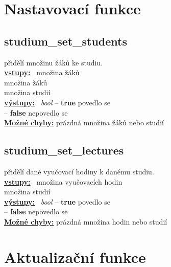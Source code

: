 \documentclass[a4paper, 11pt, twocolumn]{article}
\begin{document}
\section{Nastavovací funkce}\label{nastavovacuxed-funkce}

\subsection{studium\_set\_students}\label{studiumux5fsetux5fstudents}
\vspace*{-0.3cm}
přidělí množinu žáků ke studiu. \\
\noindent \underline{\textbf{vstupy:}} \, množina žáků  \\
\noindent \hspace*{1.4cm} množina žáků \\
\noindent \hspace*{1.4cm} množina studií  \\
\noindent \underline{\textbf{výstupy:}} \, \textit{bool} -- \textbf{true} povedlo se \\
\hspace*{2.35cm} -- \textbf{false} nepovedlo se  \\
\underline{\textbf{Možné chyby:}} prázdná množina žáků nebo studií

\subsection{studium\_set\_lectures}\label{studiumux5fsetux5flectures}
\vspace*{-0.3cm}
přidělí dané vyučovací hodiny k danému studiu. \\
\noindent \underline{\textbf{vstupy:}} \, množina vyučovacích hodin  \\
\noindent \hspace*{1.4cm} množina studií \\
\noindent \underline{\textbf{výstupy:}} \, \textit{bool} -- \textbf{true} povedlo se \\
\hspace*{2.35cm} -- \textbf{false} nepovedlo se  \\
\underline{\textbf{Možné chyby:}} prázdná množina hodin nebo studií
\vfill


\pagebreak


\section{Aktualizační funkce}\label{aktualizaux10dnuxed-funkce}
\end{document}
